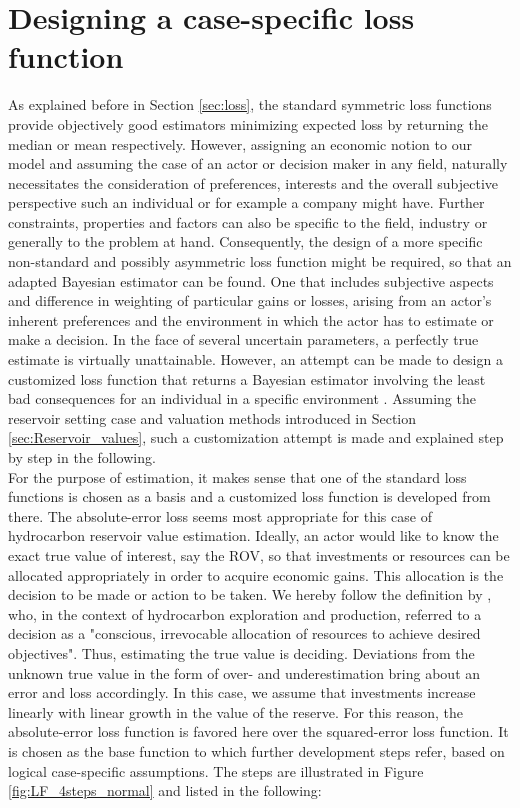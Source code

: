 		
		\section{Designing a case-specific loss function}\label{sec:LF_design}	
		As explained before in Section \ref{sec:loss}, the standard symmetric loss functions provide objectively good estimators minimizing expected loss by returning the median or mean respectively. However, assigning an economic notion to our model and assuming the case of an actor or decision maker in any field, naturally necessitates the consideration of preferences, interests and the overall subjective perspective such an individual or for example a company might have. Further constraints, properties and factors can also be specific to the field, industry or generally to the problem at hand. Consequently, the design of a more specific non-standard and possibly asymmetric loss function might be required, so that an adapted Bayesian estimator can be found. One that includes subjective aspects and difference in weighting of particular gains or losses, arising from an actor's inherent preferences and the environment in which the actor has to estimate or make a decision. In the face of several uncertain parameters, a perfectly true estimate is virtually unattainable. However, an attempt can be made to design a customized loss function that returns a Bayesian estimator involving the least bad consequences for an individual in a specific environment \citep{davidson2015, hennig2007}. Assuming the reservoir setting case and valuation methods introduced in Section \ref{sec:Reservoir_values}, such a customization attempt is made and explained step by step in the following.\\
		For the purpose of estimation, it makes sense that one of the standard loss functions is chosen as a basis and a customized loss function is developed from there. The absolute-error loss seems most appropriate for this case of hydrocarbon reservoir value estimation. Ideally, an actor would like to know the exact true value of interest, say the ROV, so that investments or resources can be allocated appropriately in order to acquire economic gains. This allocation is the decision to be made or action to be taken. We hereby follow the definition by \citet{bratvold2010making}, who, in the context of hydrocarbon exploration and production, referred to a decision as a "conscious, irrevocable allocation of resources to achieve desired objectives". Thus, estimating the true value is deciding. Deviations from the unknown true value in the form of over- and underestimation bring about an error and loss accordingly. In this case, we assume that investments increase linearly with linear growth in the value of the reserve. For this reason, the absolute-error loss function is favored here over the squared-error loss function. It is chosen as the base function to which further development steps refer, based on logical case-specific assumptions. The steps are illustrated in Figure \ref{fig:LF_4steps_normal} and listed in the following:
